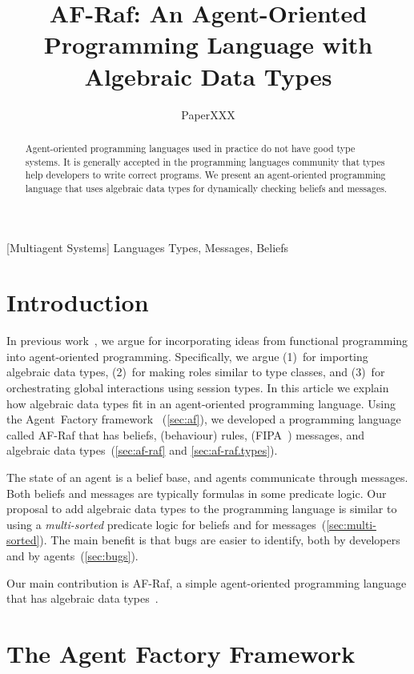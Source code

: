 \documentclass{aamas2012} %
\title{
  AF-Raf: An Agent-Oriented Programming Language with Algebraic Data Types}
\author{
\alignauthor
PaperXXX
}
\theoremstyle{remark}
\begin{document}
\maketitle
\begin{abstract} %
Agent-oriented programming languages used in practice do not have good type
systems. It is generally accepted in the programming languages community
that types help developers to write correct programs. We present an
agent-oriented programming language that uses algebraic data types for
dynamically checking beliefs and messages.
\end{abstract} %
[Multiagent Systems]
\terms Languages
\keywords Types, Messages, Beliefs

\section{Introduction} %

In previous work~\cite{grigore2011}, we argue for incorporating ideas from
functional programming into agent-oriented programming. Specifically, we
argue (1)~for importing algebraic data types, (2)~for making roles similar
to type classes, and (3)~for orchestrating global interactions using
session types. In this article we explain how algebraic data types fit in
an agent-oriented programming language. Using the Agent~Factory
framework~\cite{russell2011af} (\autoref{sec:af}), we developed a
programming language called AF-Raf that has beliefs, (behaviour) rules,
(FIPA~\cite{poslad2000fipa}) messages, and algebraic data
types~(\autoref{sec:af-raf} and \autoref{sec:af-raf.types}).

The state of an agent is a belief base, and agents communicate through
messages. Both beliefs and messages are typically formulas in some
predicate logic. Our proposal to add algebraic data types to the
programming language is similar to using a \emph{multi-sorted} predicate
logic for beliefs and for messages~(\autoref{sec:multi-sorted}). The main
benefit is that bugs are easier to identify, both by developers and by
agents~(\autoref{sec:bugs}).

Our main contribution is AF-Raf, a simple agent-oriented programming
language that has algebraic data types~\cite{site:af-raf}.

\section{The Agent Factory Framework} \label{sec:af} %
\end{document}
